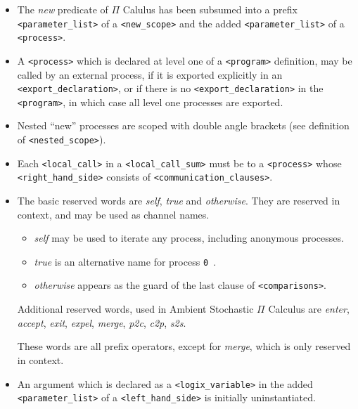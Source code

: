 \begin{itemize}

\item
The {\em new} predicate of $\Pi$ Calulus has been subsumed into a prefix
\verb+<parameter_list>+ of a \verb+<new_scope>+
and the added \verb+<parameter_list>+ \linebreak of a \verb+<process>+.

\item
A \verb+<process>+ which is declared at level one of a
\verb+<program>+ definition, may be called by an external process,
if it is exported explicitly in an \verb+<export_declaration>+,
or if there is no \verb+<export_declaration>+ \linebreak in the
\verb+<program>+,
in which case all level one processes are exported.

\item
Nested  ``new'' processes are scoped with double angle brackets (see
definition of \verb+<nested_scope>+).

\item
Each \verb+<local_call>+ in a \verb+<local_call_sum>+ must be
to a \verb+<process>+ \linebreak
whose \verb+<right_hand_side>+ consists
of \verb+<communication_clauses>+.

\item
The basic reserved words are {\em self}, {\em true} and
{\em otherwise}.
They are reserved in context, and may be used as channel names.

\begin{itemize}
\item
{\em self} may be used to iterate any process, including anonymous processes.
\item
{\em true} is an alternative name for process \verb+0 +.
\item
{\em otherwise} appears as the guard of the last clause of
\verb+<comparisons>+.
\end{itemize}

\noindent
Additional reserved words, used in Ambient Stochastic $\Pi$
Calculus are {\em enter}, {\em accept},
{\em exit}, {\em expel}, {\em merge}, {\em p2c}, {\em c2p}, {\em s2s}.

These words are all prefix operators, except for {\em merge}, which
is only reserved in context.

\item
An argument which is declared as a \verb+<logix_variable>+
in the added \verb+<parameter_list>+ of a \verb+<left_hand_side>+
is initially uninstantiated.


\end{itemize}
